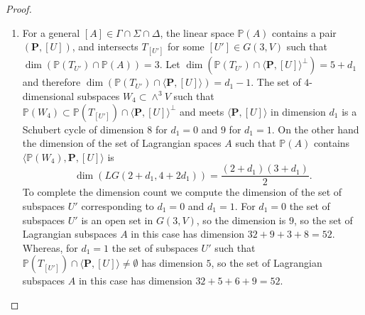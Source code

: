 \documentclass[a4paper,11pt]{amsart}
\theoremstyle{definition}
\numberwithin{equation}{section}
\numberwithin{equation}{section} \theoremstyle{definition}
\begin{document}
\begin{proof}
\begin{enumerate}
\item For a general $[A]\in \Gamma\cap\Sigma\cap\Delta$, the linear space ${{\mathbb{P}}}(A)$ contains a pair $(\mathbf{P},[U])$, and intersects $T_{[U']}$  for some $[U']\in G(3,V)$ such that  $\dim ({{\mathbb{P}}}(T_{U'})\cap{{\mathbb{P}}}(A))=3$. 
Let  $\dim ({{\mathbb{P}}}(T_{U'})\cap \langle\mathbf{P},[U]\rangle^{\perp})=5+d_1$ and therefore
$\dim ({{\mathbb{P}}}(T_{U'})\cap \langle\mathbf{P},[U]\rangle)=d_1-1$. 
The set of $4$-dimensional subspaces $W_4\subset \wedge^3V$ such that  ${{\mathbb{P}}}(W_4)\subset {{\mathbb{P}}}(T_{[U']})\cap \langle\mathbf{P},[U]\rangle^{\perp}$ and meets $\langle\mathbf{P},[U]\rangle$ in dimension $d_1$ is a Schubert cycle of dimension $8$ for $d_1=0$ and $9$ for $d_1=1$.  On the other hand the dimension of the set of Lagrangian spaces $A$ such that ${{\mathbb{P}}}(A)$ contains $\langle {{\mathbb{P}}}(W_4),\mathbf{P},[U]\rangle$ is 
\[
\dim(LG(2+d_1,4+2d_1))=\frac{(2+d_1)(3+d_1)}{2}.
\]
 To complete the dimension count we compute the dimension of the set of subspaces $U'$ corresponding to $d_1=0$ and $d_1=1$. 
For $d_1=0$  the set of subspaces $U'$ is an open set in $G(3,V)$, so the dimension is $9$, so the set of Lagrangian subspaces $A$ in this case has dimension $32+9+3+8=52$. Whereas, for $d_1=1$ the set of subspaces $U'$ such that ${{\mathbb{P}}}(T_{[U']})\cap \langle\mathbf{P},[U]\rangle\not=\emptyset$ has dimension $5$, so 
 the set of Lagrangian subspaces $A$ in this case has dimension $32+5+6+9=52$.

\end{enumerate} 
\end{proof}
\end{document}
